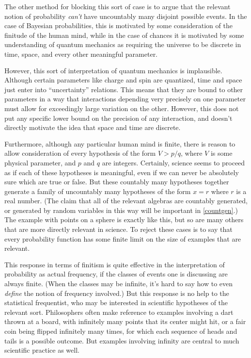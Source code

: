 The other method for blocking this sort of case is to argue that the relevant notion of probability \emph{can't} have uncountably many disjoint possible events. In the case of Bayesian probabilities, this is motivated by some consideration of the finitude of the human mind, while in the case of chances it is motivated by some understanding of quantum mechanics as requiring the universe to be discrete in time, space, and every other meaningful parameter.

However, this sort of interpretation of quantum mechanics is implausible. Although certain parameters like charge and spin are quantized, time and space just enter into ``uncertainty'' relations. This means that they are bound to other parameters in a way that interactions depending very precisely on one parameter must allow for exceedingly large variation on the other. However, this does not put any specific lower bound on the precision of any interaction, and doesn't directly motivate the idea that space and time are discrete.

Furthermore, although any particular human mind is finite, there is reason to allow consideration of every hypothesis of the form $V>p/q$, where $V$ is some physical parameter, and $p$ and $q$ are integers. Certainly, science seems to proceed as if each of these hypotheses is meaningful, even if we can never be absolutely sure which are true or false. But these countably many hypotheses together generate a family of uncountably many hypotheses of the form $x=r$ where $r$ is a real number. (The claim that all of the relevant algebras are countably generated, or generated by random variables in this way will be important in \autoref{countgen}.) The example with points on a sphere is exactly like this, but so are many others that are more directly relevant in science. To reject these cases is to say that every probability function has some finite limit on the size of examples that are relevant.

This response in terms of finitism is quite effective in the interpretation of probability as actual frequency, if the classes of events one is discussing are always finite. (When the classes may be infinite, it's hard to say how to even \emph{define} the notion of frequency involved.) But this response is no help to the statistical frequentist, who may be interested in scientific hypotheses of the relevant sort. Philosophers often make reference to examples involving a dart thrown at a board, with infinitely many points that its center might hit, or a fair coin being flipped infinitely many times, for which each sequence of heads and tails is a possible outcome. But examples involving infinity are central to much scientific practice as well.

